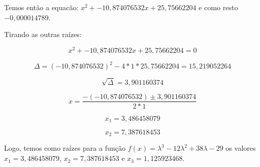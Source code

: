 \begin{example}
Temos então a equacão: $x^{2}+-10,874076532x+25,75662204$ e como resto $-0,000014789$.

Tirando as outras raízes:

$$x^{2}+-10,874076532x+25,75662204=0$$

$$\Delta=(-10,874076532)^{2}-4*1*25,75662204=15,219052264$$

$$\sqrt{\Delta}=3,901160374$$

$$x=\frac{-(-10,874076532)\pm3,901160374}{2*1}$$

$$x_{1}=3,486458079$$

$$x_{2}=7,387618453$$

Logo, temos como raízes para a função $f(x)=\lambda^{3}-12\lambda^{2}+38\lambda-29$ os valores $x_{1}=3,486458079$, $x_{2}=7,387618453$ e $x_{3}=1,125923468$.

\end{example}

